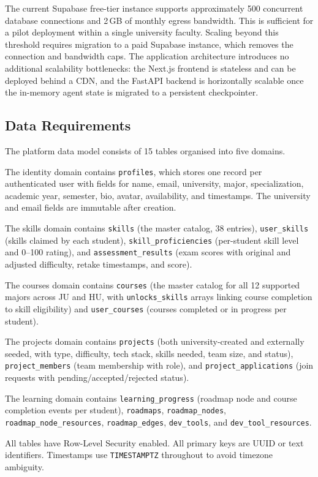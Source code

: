 \documentclass[12pt,a4paper]{article}
\begin{document}
The current Supabase free-tier instance supports approximately 500 concurrent database
connections and 2\,GB of monthly egress bandwidth. This is sufficient for a pilot deployment
within a single university faculty. Scaling beyond this threshold requires migration to a
paid Supabase instance, which removes the connection and bandwidth caps. The application
architecture introduces no additional scalability bottlenecks: the Next.js frontend is
stateless and can be deployed behind a CDN, and the FastAPI backend is horizontally
scalable once the in-memory agent state is migrated to a persistent checkpointer.

\subsection{Data Requirements}

The platform data model consists of 15 tables organised into five domains.

The identity domain contains \texttt{profiles}, which stores one record per authenticated
user with fields for name, email, university, major, specialization, academic year,
semester, bio, avatar, availability, and timestamps. The university and email fields are
immutable after creation.

The skills domain contains \texttt{skills} (the master catalog, 38 entries),
\texttt{user\_skills} (skills claimed by each student), \texttt{skill\_proficiencies}
(per-student skill level and 0--100 rating), and \texttt{assessment\_results} (exam scores
with original and adjusted difficulty, retake timestamps, and score).

The courses domain contains \texttt{courses} (the master catalog for all 12 supported
majors across JU and HU, with \texttt{unlocks\_skills} arrays linking course completion to
skill eligibility) and \texttt{user\_courses} (courses completed or in progress per student).

The projects domain contains \texttt{projects} (both university-created and externally
seeded, with type, difficulty, tech stack, skills needed, team size, and status),
\texttt{project\_members} (team membership with role), and \texttt{project\_applications}
(join requests with pending/accepted/rejected status).

The learning domain contains \texttt{learning\_progress} (roadmap node and course
completion events per student), \texttt{roadmaps}, \texttt{roadmap\_nodes},
\texttt{roadmap\_node\_resources}, \texttt{roadmap\_edges}, \texttt{dev\_tools}, and
\texttt{dev\_tool\_resources}.

All tables have Row-Level Security enabled. All primary keys are UUID or text identifiers.
Timestamps use \texttt{TIMESTAMPTZ} throughout to avoid timezone ambiguity.
\end{document}
